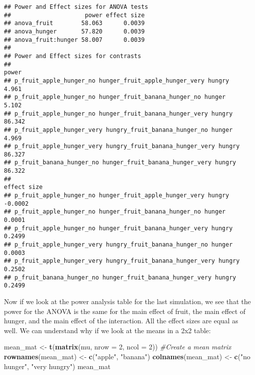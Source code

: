 \documentclass[]{article}
\newenvironment{Shaded}{\begin{snugshade}}{\end{snugshade}}
\newcommand{\KeywordTok}[1]{\textcolor[rgb]{0.13,0.29,0.53}{\textbf{#1}}}
\newcommand{\DataTypeTok}[1]{\textcolor[rgb]{0.13,0.29,0.53}{#1}}
\newcommand{\DecValTok}[1]{\textcolor[rgb]{0.00,0.00,0.81}{#1}}
\newcommand{\StringTok}[1]{\textcolor[rgb]{0.31,0.60,0.02}{#1}}
\newcommand{\CommentTok}[1]{\textcolor[rgb]{0.56,0.35,0.01}{\textit{#1}}}
\newcommand{\NormalTok}[1]{#1}
\begin{document}
\begin{verbatim}
## Power and Effect sizes for ANOVA tests
##                     power effect size
## anova_fruit        58.063      0.0039
## anova_hunger       57.820      0.0039
## anova_fruit:hunger 58.007      0.0039
## 
## Power and Effect sizes for contrasts
##                                                                   power
## p_fruit_apple_hunger_no hunger_fruit_apple_hunger_very hungry     4.961
## p_fruit_apple_hunger_no hunger_fruit_banana_hunger_no hunger      5.102
## p_fruit_apple_hunger_no hunger_fruit_banana_hunger_very hungry   86.342
## p_fruit_apple_hunger_very hungry_fruit_banana_hunger_no hunger    4.969
## p_fruit_apple_hunger_very hungry_fruit_banana_hunger_very hungry 86.327
## p_fruit_banana_hunger_no hunger_fruit_banana_hunger_very hungry  86.322
##                                                                  effect size
## p_fruit_apple_hunger_no hunger_fruit_apple_hunger_very hungry        -0.0002
## p_fruit_apple_hunger_no hunger_fruit_banana_hunger_no hunger          0.0001
## p_fruit_apple_hunger_no hunger_fruit_banana_hunger_very hungry        0.2499
## p_fruit_apple_hunger_very hungry_fruit_banana_hunger_no hunger        0.0003
## p_fruit_apple_hunger_very hungry_fruit_banana_hunger_very hungry      0.2502
## p_fruit_banana_hunger_no hunger_fruit_banana_hunger_very hungry       0.2499
\end{verbatim}

Now if we look at the power analysis table for the last simulation, we
see that the power for the ANOVA is the same for the main effect of
fruit, the main effect of hunger, and the main effect of the
interaction. All the effect sizes are equal as well. We can understand
why if we look at the means in a 2x2 table:

\begin{Shaded}
\begin{Highlighting}[]
\NormalTok{mean_mat <-}\StringTok{ }\KeywordTok{t}\NormalTok{(}\KeywordTok{matrix}\NormalTok{(mu, }
                     \DataTypeTok{nrow =} \DecValTok{2}\NormalTok{,}
                     \DataTypeTok{ncol =} \DecValTok{2}\NormalTok{)) }\CommentTok{#Create a mean matrix}
\KeywordTok{rownames}\NormalTok{(mean_mat) <-}\StringTok{ }\KeywordTok{c}\NormalTok{(}\StringTok{"apple"}\NormalTok{, }\StringTok{"banana"}\NormalTok{)}
\KeywordTok{colnames}\NormalTok{(mean_mat) <-}\StringTok{ }\KeywordTok{c}\NormalTok{(}\StringTok{"no hunger"}\NormalTok{, }\StringTok{"very hungry"}\NormalTok{)}
\NormalTok{mean_mat}
\end{Highlighting}
\end{Shaded}
\end{document}
